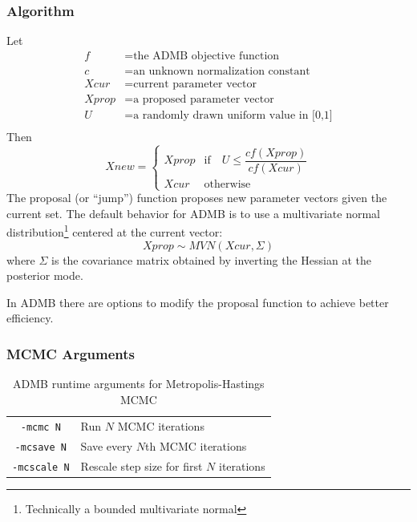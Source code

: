 \documentclass{article}\usepackage[]{graphicx}\usepackage[]{color}
\begin{document}
\subsubsection{Algorithm}
Let
\begin{align*}
  f&=\text{the ADMB objective function}\\
  c&=\text{an unknown normalization constant}\\
  Xcur&=\text{current parameter vector}\\
  Xprop&=\text{a proposed parameter vector}\\
  U&=\text{a randomly drawn uniform value in [0,1]}\\
\end{align*}
Then
\begin{equation}
  Xnew=
  \begin{cases}
    Xprop & \text{if} \quad U\leq \dfrac{cf(Xprop)}{cf(Xcur)}\\
    Xcur & \text{otherwise}
  \end{cases}
\end{equation}
The proposal (or ``jump'') function proposes new parameter
vectors given the current set. The default behavior for ADMB
is to use a multivariate normal
distribution\footnote{Technically a bounded multivariate
  normal} centered at the current vector:
\begin{equation*}
  Xprop\sim MVN(Xcur, \Sigma)
\end{equation*}
 where $\Sigma$ is the covariance matrix obtained by
 inverting the Hessian at the posterior mode. 

In ADMB there are options to modify the proposal function to
achieve better efficiency.

\subsubsection{MCMC Arguments}
\begin{table}[h]
  \centering
  \begin{tabular}[h]{|cl|}
    \hline
    \texttt{-mcmc N} & Run $N$ MCMC iterations\\
    \texttt{-mcsave N} & Save every $N$th MCMC iterations\\
    \texttt{-mcscale N} & Rescale step size for first $N$ iterations\\
    \hline
  \end{tabular}
  \caption{ADMB runtime arguments for Metropolis-Hastings MCMC}
  \label{tab:mh_args}
\end{table}
\end{document}
